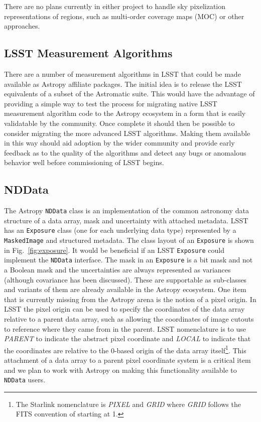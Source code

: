 \documentclass[]{spie}  %
\begin{document}
There are no plans currently in either project to handle sky pixelization representations of regions, such as multi-order coverage maps (MOC)\cite{2012ASPC..461..347F,2014ivoa.spec.0602F} or other approaches\cite{2015A&A...580A.132R}.

\subsection{LSST Measurement Algorithms}

There are a number of measurement algorithms in LSST that could be made available as Astropy affiliate packages\cite{bosch_2016_48435}.
The initial idea is to release the LSST equivalents of a subset of the Astromatic suite\cite{2012ASSP...29...71B}.
This would have the advantage of providing a simple way to test the process for migrating native LSST measurement algorithm code to the Astropy ecosystem in a form that is easily validatable by the community.
Once complete it should then be possible to consider migrating the more advanced LSST algorithms.
Making them available in this way should aid adoption by the wider community and provide early feedback as to the quality of the algorithms and detect any bugs or anomalous behavior well before commissioning of LSST begins.

\subsection{NDData}

The Astropy \texttt{NDData} class is an implementation of the common astronomy data structure\cite{2015A&C....12..146J} of a data array, mask and uncertainty with attached metadata.
LSST has an \texttt{Exposure} class (one for each underlying data type) represented by a \texttt{MaskedImage} and structured metadata.
The class layout of an \texttt{Exposure} is shown in Fig.~\ref{fig:exposure}.
It would be beneficial if an LSST \texttt{Exposure} could implement the \texttt{NDData} interface.
The mask in an \texttt{Exposure} is a bit mask and not a Boolean mask and the uncertainties are always represented as variances (although covariance has been discussed).
These are supportable as sub-classes and variants of them are already available in the Astropy ecosystem.
One item that is currently missing from the Astropy arena is the notion of a pixel origin.
In LSST the pixel origin can be used to specify the coordinates of the data array relative to a parent data array, such as allowing the coordinates of image cutouts to reference where they came from in the parent.
LSST nomenclature is to use \emph{PARENT} to indicate the abstract pixel coordinate and \emph{LOCAL} to indicate that the coordinates are relative to the 0-based origin of the data array itself\footnote{The Starlink nomenclature\cite{2015A&C....12..146J} is \emph{PIXEL} and \emph{GRID} where \emph{GRID} follows the FITS convention of starting at 1.}.
This attachment of a data array to a parent pixel coordinate system is a critical item and we plan to work with Astropy on making this functionality available to \texttt{NDData} users.
\end{document}
